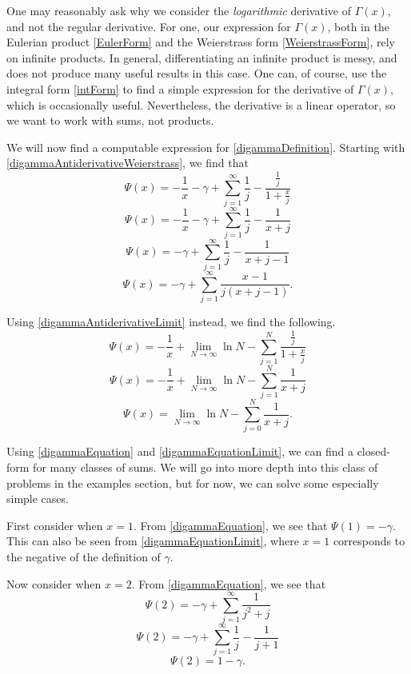 One may reasonably ask why we consider the \textit{logarithmic} derivative of $\Gamma(x)$, and not the regular derivative. 
For one, our expression for $\Gamma(x)$, both in the Eulerian product \eqref{EulerForm} and the Weierstrass form \eqref{WeierstrassForm}, rely on infinite products.
In general, differentiating an infinite product is messy, and does not produce many useful results in this case.
One can, of course, use the integral form \eqref{intForm} to find a simple expression for the derivative of $\Gamma(x)$, which is occasionally useful.
Nevertheless, the derivative is a linear operator, so we want to work with sums, not products.

We will now find a computable expression for \eqref{digammaDefinition}.
Starting with \eqref{digammaAntiderivativeWeierstrass}, we find that 
$$\Psi(x) = -\frac{1}{x} - \gamma + \sum_{j=1}^\infty \frac{1}{j} - \frac{\frac{1}{j}}{1 + \frac{x}{j}}$$
$$\Psi(x) = -\frac{1}{x} - \gamma + \sum_{j=1}^\infty \frac{1}{j} - \frac{1}{x + j}$$
$$\Psi(x) = -\gamma + \sum_{j=1}^\infty \frac{1}{j} - \frac{1}{x + j -1}$$
\begin{equation}\label{digammaEquation}
\boxed{\Psi(x) = -\gamma + \sum_{j=1}^\infty \frac{x - 1}{j (x + j -1)}}.
\end{equation}

Using \eqref{digammaAntiderivativeLimit} instead, we find the following.
$$\Psi(x) = -\frac{1}{x} + \lim_{N \rightarrow \infty} \ln N - \sum_{j=1}^N \frac{\frac{1}{j}}{1 + \frac{x}{j}}$$
$$\Psi(x) = -\frac{1}{x} + \lim_{N \rightarrow \infty} \ln N - \sum_{j=1}^N \frac{1}{x + j}$$
\begin{equation}\label{digammaEquationLimit}
\boxed{\Psi(x) = \lim_{N \rightarrow \infty} \ln N - \sum_{j=0}^N \frac{1}{x + j}}.
\end{equation}

Using \eqref{digammaEquation} and \eqref{digammaEquationLimit}, we can find a closed-form for many classes of sums.
We will go into more depth into this class of problems in the examples section, but for now, we can solve some especially simple cases.

First consider when $x = 1$.
From \eqref{digammaEquation}, we see that $\Psi(1) = -\gamma$.
This can also be seen from \eqref{digammaEquationLimit}, where $x = 1$ corresponds to the negative of the definition of $\gamma$.

Now consider when $x = 2$. 
From \eqref{digammaEquation}, we see that
$$\Psi(2) = -\gamma + \sum_{j=1}^\infty \frac{1}{j^2 + j}$$
$$\Psi(2) = -\gamma + \sum_{j=1}^\infty \frac{1}{j} - \frac{1}{j+1}$$
$$\Psi(2) = 1 - \gamma.$$


